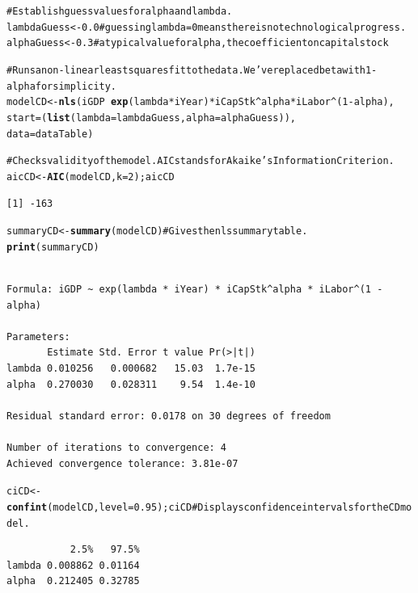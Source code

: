 \documentclass[preprint,authoryear,12pt]{elsarticle}\usepackage{graphicx, color}
\makeatletter
\newcommand{\hlfunctioncall}[1]{\textcolor[rgb]{0.501960784313725,0,0.329411764705882}{\textbf{#1}}}%
\newcommand{\hlcomment}[1]{\textcolor[rgb]{0.180392156862745,0.6,0.341176470588235}{#1}}%
\newenvironment{kframe}{%
 \def\at@end@of@kframe{}%
 \ifinner\ifhmode%
  \def\at@end@of@kframe{\end{minipage}}%
  \begin{minipage}{\columnwidth}%
 \fi\fi%
 \def\FrameCommand##1{\hskip\@totalleftmargin \hskip-\fboxsep
 \colorbox{shadecolor}{##1}\hskip-\fboxsep
     \hskip-\linewidth \hskip-\@totalleftmargin \hskip\columnwidth}%
 \MakeFramed {\advance\hsize-\width
   \@totalleftmargin\z@ \linewidth\hsize
   \@setminipage}}%
 {\par\unskip\endMakeFramed%
 \at@end@of@kframe}
\newenvironment{knitrout}{}{} %
\makeatother
\begin{document}
\begin{knitrout}
\color{fgcolor}\begin{kframe}
\begin{alltt}
\hlcomment{# Establish guess values for alpha and lambda.}
lambdaGuess <- 0.0 \hlcomment{# guessing lambda = 0 means there is no technological progress.}
alphaGuess <- 0.3 \hlcomment{# a typical value for alpha, the coefficient on capital stock}

\hlcomment{# Runs a non-linear least squares fit to the data. We've replaced beta with 1-alpha for simplicity.}
modelCD <- \hlfunctioncall{nls}(iGDP ~ \hlfunctioncall{exp}(lambda*iYear) * iCapStk^alpha * iLabor^(1 - alpha), 
               start=(\hlfunctioncall{list}(lambda=lambdaGuess,alpha=alphaGuess)),
               data=dataTable)

\hlcomment{# Checks validity of the model. AIC stands for Akaike's Information Criterion.}
aicCD  <- \hlfunctioncall{AIC}(modelCD, k=2); aicCD
\end{alltt}
\begin{verbatim}
[1] -163
\end{verbatim}
\begin{alltt}

summaryCD <- \hlfunctioncall{summary}(modelCD) \hlcomment{# Gives the nls summary table.}
\hlfunctioncall{print}(summaryCD)
\end{alltt}
\begin{verbatim}

Formula: iGDP ~ exp(lambda * iYear) * iCapStk^alpha * iLabor^(1 - alpha)

Parameters:
       Estimate Std. Error t value Pr(>|t|)
lambda 0.010256   0.000682   15.03  1.7e-15
alpha  0.270030   0.028311    9.54  1.4e-10

Residual standard error: 0.0178 on 30 degrees of freedom

Number of iterations to convergence: 4 
Achieved convergence tolerance: 3.81e-07 
\end{verbatim}
\begin{alltt}
ciCD <- \hlfunctioncall{confint}(modelCD, level = 0.95); ciCD \hlcomment{# Displays confidence intervals for the CD model.}
\end{alltt}


{\ttfamily\noindent\itshape\color{messagecolor}{Waiting for profiling to be done...}}\begin{verbatim}
           2.5%   97.5%
lambda 0.008862 0.01164
alpha  0.212405 0.32785
\end{verbatim}
\begin{alltt}


\end{alltt}
\end{kframe}
\end{knitrout}
\end{document}
